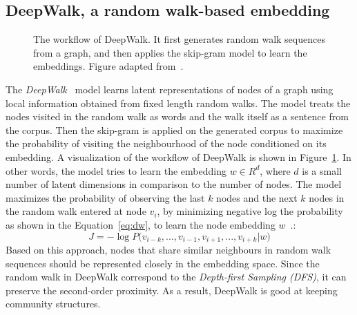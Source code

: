 \subsection{DeepWalk, a random walk-based embedding}
\label{subsec:DeepWalk}
\begin{figure}
\centering 
\resizebox{0.8\textwidth}{0.35\textwidth}{      

}
\caption{The workflow of DeepWalk. It first generates random walk sequences from a graph, and then applies the skip-gram model to learn the embeddings. Figure adapted from~.}
\label{fig:deepwalk}
\end{figure}

The \emph{DeepWalk}~ model learns latent representations of nodes of a graph using local information obtained from fixed length random walks. The model treats the nodes visited in the random walk as words and the walk itself as  a sentence from the corpus. Then the skip-gram is applied on the generated corpus to maximize the probability of visiting the neighbourhood of the node conditioned on its embedding. A visualization of the workflow of DeepWalk is shown in Figure~\ref{fig:deepwalk}. In other words, the model tries to learn the embedding $w\in R^{ d} $, where $d$ is a small number of latent dimensions in comparison to the number of nodes. The model maximizes the probability of observing the last $k$ nodes and the next $k$ nodes in the random walk entered at node $v_{i}$, by minimizing negative log the probability as shown in the Equation~\ref{eq:dw}, to learn the node embedding $w$~.: 
\begin{equation}
J=-\log { P( } v_{ { i−k } },...,v_{ i−1 },v_{ i+1 },...,v_{ i+k }|w )
\label{eq:dw}
\end{equation}
Based on this approach, nodes that share similar neighbours in random walk sequences should be represented closely in the embedding space. Since the random walk in DeepWalk correspond to the \emph{Depth-first Sampling (DFS)}, it can preserve the second-order proximity. As a result, DeepWalk is good at keeping community structures. 
